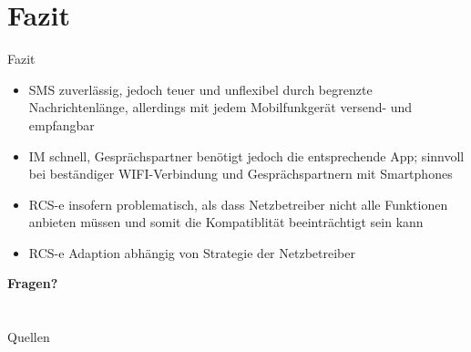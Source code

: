 \documentclass{beamer}
\begin{document}
\section{Fazit}
\begin{frame}{Fazit}
	\begin{itemize}
		\item SMS zuverlässig, jedoch teuer und unflexibel durch begrenzte 
			Nachrichtenlänge, allerdings 
			mit jedem Mobilfunkgerät versend- und empfangbar
		\item IM schnell, Gesprächspartner benötigt jedoch die entsprechende
			App; sinnvoll bei beständiger WIFI-Verbindung und Gesprächspartnern
			mit Smartphones
		\item RCS-e insofern problematisch, als dass Netzbetreiber nicht alle
			Funktionen anbieten müssen und somit die Kompatiblität beeinträchtigt
			sein kann
		\item RCS-e Adaption abhängig von Strategie der Netzbetreiber
	\end{itemize}
\end{frame}


\begin{frame}
	\begin{center}
	\Huge{\textbf{Fragen?}}
	\end{center}
\end{frame}


\section{}
\begin{frame}{Quellen}	
	\tiny{
		\nocite{thesms,tutgsm,wikipedia:smsgsm}
		
	}
\end{frame}
\end{document}
